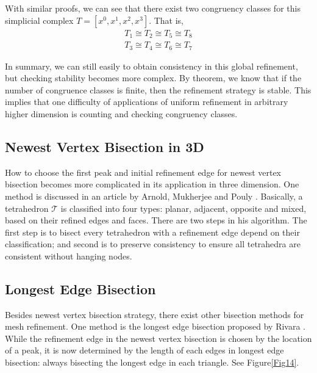 With similar proofs, we can see that there exist two congruency classes for this simplicial complex $T = [x^0, x^1, x^2, x^3]$. That is,
\begin{align*}
T_1 \cong T_2 \cong T_5 \cong T_8 \\
T_3 \cong T_4 \cong T_6 \cong T_7
\end{align*}

In summary, we can still easily to obtain consistency in this global refinement, but checking stability becomes more complex. By theorem, we know that if the number of congruence classes is finite, then the refinement strategy is stable. This implies that one difficulty of applications of uniform refinement in arbitrary higher dimension is counting and checking congruency classes.

\subsection{Newest Vertex Bisection in 3D}
How to choose the first peak and initial refinement edge for newest vertex bisection becomes more complicated in its application in three dimension. One method is discussed in an article by Arnold, Mukherjee and Pouly \cite{arnold2000locally}. 
Basically, a tetrahedron $\mathcal T$ is classified into four types: planar, adjacent, opposite and mixed, based on their refined edges and faces. There are two steps in his algorithm. The first step is to bisect every tetrahedron with a refinement edge depend on their classification; and second is to preserve consistency to ensure all tetrahedra are consistent without hanging nodes.

\subsection{Longest Edge Bisection}
Besides newest vertex bisection strategy, there exist other bisection methods for mesh refinement. One method is the longest edge bisection proposed by Rivara \cite{rivara1984mesh}. While the refinement edge in the newest vertex bisection is chosen by the location of a peak, it is now determined by the length of each edges in longest edge bisection: always bisecting the longest edge in each triangle. See Figure\ref{Fig14}.

